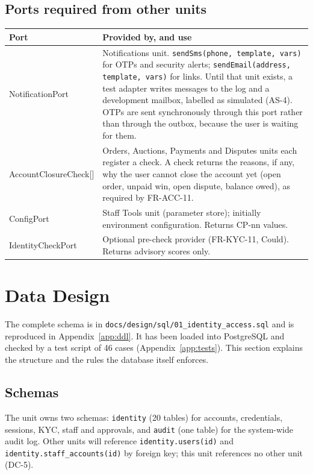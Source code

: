 \documentclass[11pt,a4paper]{article}
\newenvironment{dtable}[1]{\small\begin{longtable}{#1}}{\end{longtable}}
\begin{document}
\subsection{Ports required from other units}
\label{sec:ports-req}
\begin{dtable}{@{}>{\ttfamily}p{4.4cm}>{\raggedright\arraybackslash}p{10.8cm}@{}}
\toprule
\textnormal{\textbf{Port}} & \textbf{Provided by, and use} \\ \midrule \endhead
NotificationPort & Notifications unit. \texttt{sendSms(phone, template, vars)} for OTPs and security alerts; \texttt{sendEmail(address, template, vars)} for links. Until that unit exists, a test adapter writes messages to the log and a development mailbox, labelled as simulated (AS-4). OTPs are sent synchronously through this port rather than through the outbox, because the user is waiting for them. \\
AccountClosureCheck[] & Orders, Auctions, Payments and Disputes units each register a check. A check returns the reasons, if any, why the user cannot close the account yet (open order, unpaid win, open dispute, balance owed), as required by FR-ACC-11. \\
ConfigPort & Staff Tools unit (parameter store); initially environment configuration. Returns CP-nn values. \\
IdentityCheckPort & Optional pre-check provider (FR-KYC-11, Could). Returns advisory scores only. \\
\bottomrule
\end{dtable}
\section{Data Design}
\label{sec:data}
The complete schema is in \texttt{docs/design/sql/01\_identity\_access.sql} and is reproduced in Appendix~\ref{app:ddl}. It has been loaded into PostgreSQL and checked by a test script of 46 cases (Appendix~\ref{app:tests}). This section explains the structure and the rules the database itself enforces.

\subsection{Schemas}
The unit owns two schemas: \texttt{identity} (20 tables) for accounts, credentials, sessions, KYC, staff and approvals, and \texttt{audit} (one table) for the system-wide audit log. Other units will reference \texttt{identity.users(id)} and \texttt{identity.staff\_accounts(id)} by foreign key; this unit references no other unit (DC-5).
\end{document}
